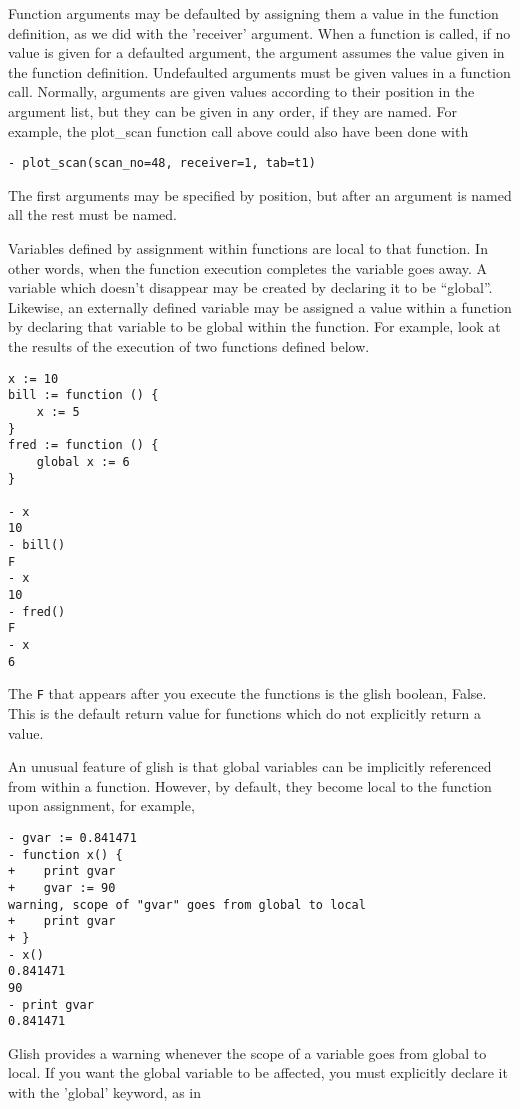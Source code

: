     Function arguments may be defaulted by assigning them a value in the
function definition, as we did with the 'receiver' argument.  When a
function is called, if no value is given for a defaulted argument, the
argument assumes the value given in the function definition.  Undefaulted
arguments must be given values in a function call.  Normally, arguments are
given values according to their position in the argument list, but they can
be given in any order, if they are named.  For example, the plot\_scan
function call above could also have been done with

\begin{verbatim}
- plot_scan(scan_no=48, receiver=1, tab=t1)
\end{verbatim}

The first arguments may be specified by position, but after an argument is
named all the rest must be named.

    Variables defined by assignment within functions are local to that
function.  In other words, when the function execution completes the
variable goes away.  A variable which doesn't disappear may be created by
declaring it to be ``global''.  Likewise, an externally defined variable may
be assigned a value within a function by declaring that variable to be
global within the function.  For example, look at the results of the
execution of two functions defined below.

\begin{verbatim}
x := 10
bill := function () {
    x := 5
}
fred := function () {
    global x := 6
}

- x
10
- bill()
F
- x
10
- fred()
F
- x
6
\end{verbatim}

The \verb!F! that appears after you execute the functions is the glish
boolean, False.  This is the default return value for functions
which do not explicitly return a value.
 
An unusual feature of glish is that global variables can be implicitly
referenced from within a function. However, by default, they become local
to the function upon assignment, for example,

\begin{verbatim}
- gvar := 0.841471
- function x() {
+    print gvar
+    gvar := 90
warning, scope of "gvar" goes from global to local
+    print gvar
+ }
- x()   
0.841471
90
- print gvar
0.841471
\end{verbatim}

Glish provides a warning whenever the scope of a variable goes from global
to local.  If you want the global variable to be affected, you must
explicitly declare it with the 'global' keyword, as in

